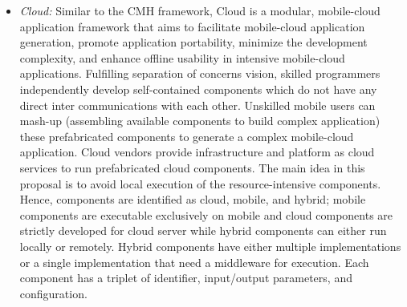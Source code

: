 \documentclass[publish]{IEEEtran}
\begin{document}
\begin{itemize}
However, developing CMH applications is significantly complex due to the interoperability and vendor lock-in problems in clouds and fragmentation issue in mobiles \cite{Z2012}. Cloud components designed for a specific cloud are not able to move to another cloud due to underlying heterogeneity among clouds. Similarly, mobile components developed for a particular platform cannot be ported to different platforms because of heterogeneity. Yet isolating development of mobile and cloud components creates further versioning and integration challenges.

To mitigate the complexity of CMH application developments and facilitate portability, the authors leverage Domain Specific Language (DSL) \cite{Ranabahu2011,Deursen2000}. A DSL is a programming language with major focus on solving problem in specific domains. MATLAB\footnote{http://www.mathworks.com/products/matlab/} is a well-known DSL-based tool for mathematicians. A parser takes a DSL script and converts codes into an in-memory object to be forwarded to various automatic component generators. The system needs different code generators for various mobile and cloud platforms. Once the mobile and cloud components are generated, the CMH application can be assembled for various mobile-cloud platforms. However, utilizing DSL-based techniques requires more generalization efforts to be beneficial in developing  all types of CMH applications.

\item \textit{Cloud:}
Similar to the CMH framework, Cloud \cite{March2011} is a modular, mobile-cloud application framework that aims to facilitate mobile-cloud application generation, promote application portability, minimize the development complexity, and enhance offline usability in intensive mobile-cloud applications. Fulfilling separation of concerns vision, skilled programmers independently develop self-contained components which do not have any direct inter communications with each other. Unskilled mobile users can mash-up (assembling available components to build complex application) these prefabricated components to generate a complex mobile-cloud application. Cloud vendors provide infrastructure and platform as cloud services to run prefabricated cloud components. The main idea in this proposal is to avoid local execution of the resource-intensive components. Hence, components are identified as cloud, mobile, and hybrid; mobile components are executable exclusively on mobile and cloud components are strictly developed for cloud server while hybrid components can either run locally or remotely. Hybrid components have either multiple implementations or a single implementation that need a middleware for execution. Each component has a triplet of identifier, input/output parameters, and configuration.


\end{itemize}
\end{document}
